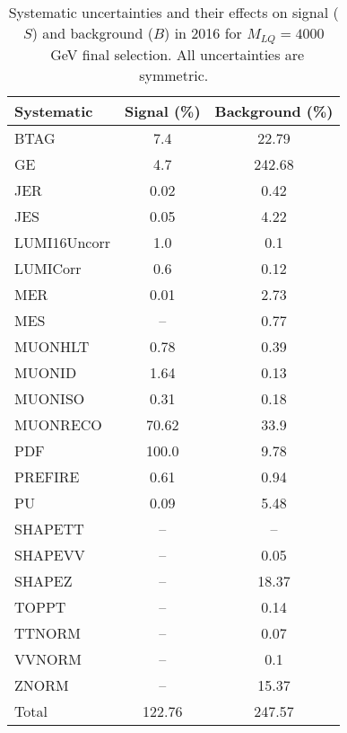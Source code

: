 \begin{table}[htbp]
\begin{center}
\caption{Systematic uncertainties and their effects on signal ($S$) and background ($B$) in 2016 for $M_{LQ}=4000$~GeV final selection. All uncertainties are symmetric.}
\begin{tabular}{lcc}
\hline\hline
Systematic & Signal (\%) & Background (\%) \\ \hline 
BTAG & 7.4 & 22.79\\ 
GE & 4.7 & 242.68\\ 
JER & 0.02 & 0.42\\ 
JES & 0.05 & 4.22\\ 
LUMI16Uncorr & 1.0 & 0.1\\ 
LUMICorr & 0.6 & 0.12\\ 
MER & 0.01 & 2.73\\ 
MES & -- & 0.77\\ 
MUONHLT & 0.78 & 0.39\\ 
MUONID & 1.64 & 0.13\\ 
MUONISO & 0.31 & 0.18\\ 
MUONRECO & 70.62 & 33.9\\ 
PDF & 100.0 & 9.78\\ 
PREFIRE & 0.61 & 0.94\\ 
PU & 0.09 & 5.48\\ 
SHAPETT & -- & --\\ 
SHAPEVV & -- & 0.05\\ 
SHAPEZ & -- & 18.37\\ 
TOPPT & -- & 0.14\\ 
TTNORM & -- & 0.07\\ 
VVNORM & -- & 0.1\\ 
ZNORM & -- & 15.37\\ 
Total & 122.76 & 247.57\\ \hline \hline
\end{tabular}
\label{tab:SysUncertainties_uujj_4000}
\end{center}
\end{table}

